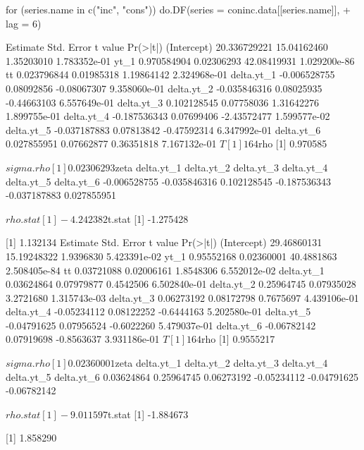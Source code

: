 \documentclass[a4paper]{article}
\renewcommand{\~}{\perispomeni}%
\begin{document}
\begin{Schunk}
\begin{Sinput}
 for (series.name in c("inc", "cons")) do.DF(series = coninc.data[[series.name]], 
+     lag = 6)
\end{Sinput}
\begin{Soutput}
                Estimate  Std. Error     t value     Pr(>|t|)
(Intercept) 20.336729221 15.04162460  1.35203010 1.783352e-01
yt_1         0.970584904  0.02306293 42.08419931 1.029200e-86
tt           0.023796844  0.01985318  1.19864142 2.324968e-01
delta.yt_1  -0.006528755  0.08092856 -0.08067307 9.358060e-01
delta.yt_2  -0.035846316  0.08025935 -0.44663103 6.557649e-01
delta.yt_3   0.102128545  0.07758036  1.31642276 1.899755e-01
delta.yt_4  -0.187536343  0.07699406 -2.43572477 1.599577e-02
delta.yt_5  -0.037187883  0.07813842 -0.47592314 6.347992e-01
delta.yt_6   0.027855951  0.07662877  0.36351818 7.167132e-01
$T
[1] 164

$rho
[1] 0.970585

$sigma.rho
[1] 0.02306293

$zeta
  delta.yt_1   delta.yt_2   delta.yt_3   delta.yt_4   delta.yt_5   delta.yt_6 
-0.006528755 -0.035846316  0.102128545 -0.187536343 -0.037187883  0.027855951 

$rho.stat
[1] -4.242382

$t.stat
[1] -1.275428

[1] 1.132134
               Estimate  Std. Error    t value     Pr(>|t|)
(Intercept) 29.46860131 15.19248322  1.9396830 5.423391e-02
yt_1         0.95552168  0.02360001 40.4881863 2.508405e-84
tt           0.03721088  0.02006161  1.8548306 6.552012e-02
delta.yt_1   0.03624864  0.07979877  0.4542506 6.502840e-01
delta.yt_2   0.25964745  0.07935028  3.2721680 1.315743e-03
delta.yt_3   0.06273192  0.08172798  0.7675697 4.439106e-01
delta.yt_4  -0.05234112  0.08122252 -0.6444163 5.202580e-01
delta.yt_5  -0.04791625  0.07956524 -0.6022260 5.479037e-01
delta.yt_6  -0.06782142  0.07919698 -0.8563637 3.931186e-01
$T
[1] 164

$rho
[1] 0.9555217

$sigma.rho
[1] 0.02360001

$zeta
 delta.yt_1  delta.yt_2  delta.yt_3  delta.yt_4  delta.yt_5  delta.yt_6 
 0.03624864  0.25964745  0.06273192 -0.05234112 -0.04791625 -0.06782142 

$rho.stat
[1] -9.011597

$t.stat
[1] -1.884673

[1] 1.858290
\end{Soutput}
\end{Schunk}
\end{document}
